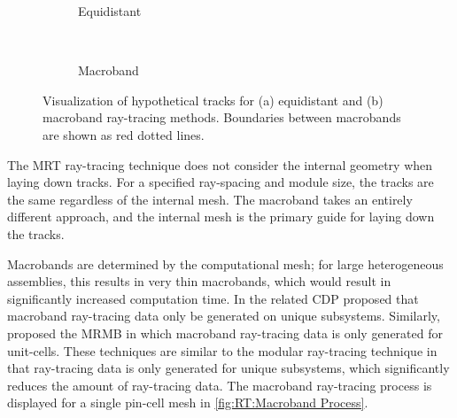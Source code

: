 {{{        \begin{figure}[h]
          \centering
          \begin{subfigure}[t]{0.45\linewidth}
            \centering
            \def\svgwidth{0.85\linewidth}
            
            \caption{Equidistant}
          \end{subfigure}%
          ~
          \begin{subfigure}[t]{0.45\linewidth}
              \centering
            \def\svgwidth{0.85\linewidth}
            
            \caption{Macroband}
          \end{subfigure}
          \caption{Visualization of hypothetical tracks for (a) equidistant and (b) macroband ray-tracing methods. Boundaries between macrobands are shown as red dotted lines.}
          \label{fig:RT:Equidisant vs Macroband}
        \end{figure}

        The \ac{MRT} ray-tracing technique does not consider the internal geometry when laying down tracks.
        For a specified ray-spacing and module size, the tracks are the same regardless of the internal mesh.
        The macroband takes an entirely different approach, and the internal mesh is the primary guide for laying down the tracks.

        Macrobands are determined by the computational mesh; for large heterogeneous assemblies, this results in very thin macrobands, which would result in significantly increased computation time.
        In the related \acf{CDP} \citet{Hong1999} proposed that macroband ray-tracing data only be generated on unique subsystems.
        Similarly, \citet{Yamamoto2005} proposed the \ac{MRMB} in which macroband ray-tracing data is only generated for unit-cells.
        These techniques are similar to the modular ray-tracing technique in that ray-tracing data is only generated for unique subsystems, which significantly reduces the amount of ray-tracing data.
        The macroband ray-tracing process is displayed for a single pin-cell mesh in \cref{fig:RT:Macroband Process}.

}}}
